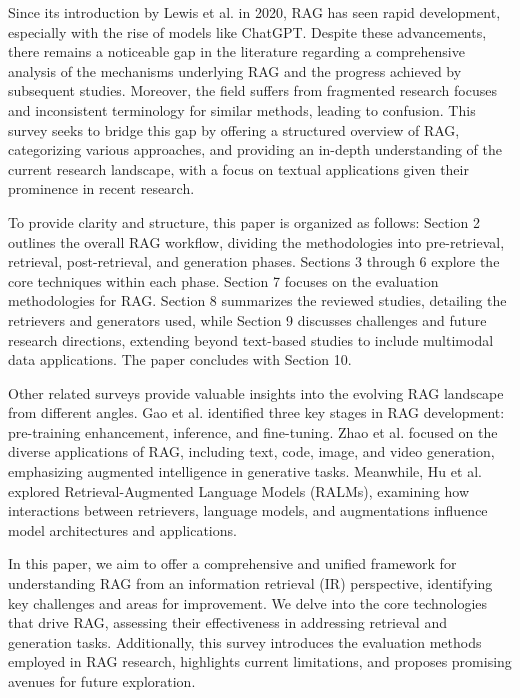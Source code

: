 Since its introduction by Lewis et al. \cite{lewis2020retrievalaugmented} in 2020, RAG has seen rapid development, especially with the rise of models like ChatGPT. Despite these advancements, there remains a noticeable gap in the literature regarding a comprehensive analysis of the mechanisms underlying RAG and the progress achieved by subsequent studies. Moreover, the field suffers from fragmented research focuses and inconsistent terminology for similar methods, leading to confusion. This survey seeks to bridge this gap by offering a structured overview of RAG, categorizing various approaches, and providing an in-depth understanding of the current research landscape, with a focus on textual applications given their prominence in recent research.

To provide clarity and structure, this paper is organized as follows: Section 2 outlines the overall RAG workflow, dividing the methodologies into pre-retrieval, retrieval, post-retrieval, and generation phases. Sections 3 through 6 explore the core techniques within each phase. Section 7 focuses on the evaluation methodologies for RAG. Section 8 summarizes the reviewed studies, detailing the retrievers and generators used, while Section 9 discusses challenges and future research directions, extending beyond text-based studies to include multimodal data applications. The paper concludes with Section 10.

Other related surveys provide valuable insights into the evolving RAG landscape from different angles. Gao et al. \cite{gao2023retrievalaugmented} identified three key stages in RAG development: pre-training enhancement, inference, and fine-tuning. Zhao et al. \cite{zhao2024retrievalaugmented} focused on the diverse applications of RAG, including text, code, image, and video generation, emphasizing augmented intelligence in generative tasks. Meanwhile, Hu et al. \cite{hu2024rau} explored Retrieval-Augmented Language Models (RALMs), examining how interactions between retrievers, language models, and augmentations influence model architectures and applications.

In this paper, we aim to offer a comprehensive and unified framework for understanding RAG from an information retrieval (IR) perspective, identifying key challenges and areas for improvement. We delve into the core technologies that drive RAG, assessing their effectiveness in addressing retrieval and generation tasks. Additionally, this survey introduces the evaluation methods employed in RAG research, highlights current limitations, and proposes promising avenues for future exploration.

